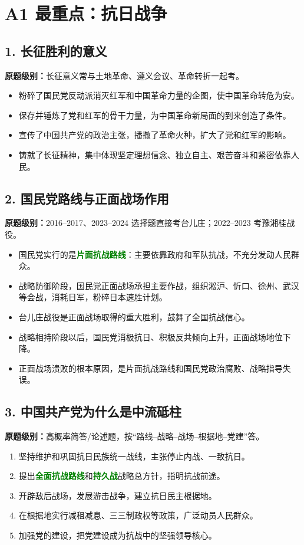 \documentclass[UTF8,zihao=-4]{ctexart}
\newcommand{\exam}[1]{\textcolor{accent}{\bfseries 原题级别：}#1}
\newcommand{\core}[1]{\textcolor{green}{\bfseries #1}}
\begin{document}
\newpage

\section{A1 最重点：抗日战争}

\subsection{1. 长征胜利的意义}
\exam{长征意义常与土地革命、遵义会议、革命转折一起考。}
\begin{itemize}
  \item 粉碎了国民党反动派消灭红军和中国革命力量的企图，使中国革命转危为安。
  \item 保存并锤炼了党和红军的骨干力量，为中国革命新局面的到来创造了条件。
  \item 宣传了中国共产党的政治主张，播撒了革命火种，扩大了党和红军的影响。
  \item 铸就了长征精神，集中体现坚定理想信念、独立自主、艰苦奋斗和紧密依靠人民。
\end{itemize}

\subsection{2. 国民党路线与正面战场作用}
\exam{2016--2017、2023--2024 选择题直接考台儿庄；2022--2023 考豫湘桂战役。}
\begin{itemize}
  \item 国民党实行的是\core{片面抗战路线}：主要依靠政府和军队抗战，不充分发动人民群众。
  \item 战略防御阶段，国民党正面战场承担主要作战，组织淞沪、忻口、徐州、武汉等会战，消耗日军，粉碎日本速胜计划。
  \item 台儿庄战役是正面战场取得的重大胜利，鼓舞了全国抗战信心。
  \item 战略相持阶段以后，国民党消极抗日、积极反共倾向上升，正面战场地位下降。
  \item 正面战场溃败的根本原因，是片面抗战路线和国民党政治腐败、战略指导失误。
\end{itemize}

\subsection{3. 中国共产党为什么是中流砥柱}
\exam{高概率简答/论述题，按“路线--战略--战场--根据地--党建”答。}
\begin{enumerate}
  \item 坚持维护和巩固抗日民族统一战线，主张停止内战、一致抗日。
  \item 提出\core{全面抗战路线}和\core{持久战}战略总方针，指明抗战前途。
  \item 开辟敌后战场，发展游击战争，建立抗日民主根据地。
  \item 在根据地实行减租减息、三三制政权等政策，广泛动员人民群众。
  \item 加强党的建设，把党建设成为抗战中的坚强领导核心。
\end{enumerate}
\end{document}
